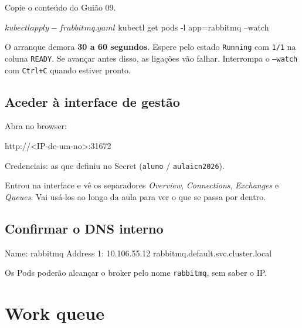 \documentclass[11pt,a4paper]{article}
\begin{document}
Copie o conteúdo do Guião 09.

\begin{terminal}
$ kubectl apply -f rabbitmq.yaml
$ kubectl get pods -l app=rabbitmq --watch
\end{terminal}

\begin{atencao}
O arranque demora \textbf{30 a 60 segundos}. Espere pelo estado \texttt{Running} com \texttt{1/1} na coluna \texttt{READY}. Se avançar antes disso, as ligações vão falhar. Interrompa o \texttt{--watch} com \texttt{Ctrl+C} quando estiver pronto.
\end{atencao}

\subsection{Aceder à interface de gestão}

Abra no browser:
\begin{terminal}
http://<IP-de-um-no>:31672
\end{terminal}

Credenciais: as que definiu no Secret (\texttt{aluno} / \texttt{aulaicn2026}).

\begin{verificar}
Entrou na interface e vê os separadores \emph{Overview}, \emph{Connections}, \emph{Exchanges} e \emph{Queues}. Vai usá-los ao longo da aula para ver o que se passa por dentro.
\end{verificar}

\subsection{Confirmar o DNS interno}


\begin{saida}
Name:      rabbitmq
Address 1: 10.106.55.12 rabbitmq.default.svc.cluster.local
\end{saida}

Os Pods poderão alcançar o broker pelo nome \texttt{rabbitmq}, sem saber o IP.

\section{Work queue}
\end{document}
